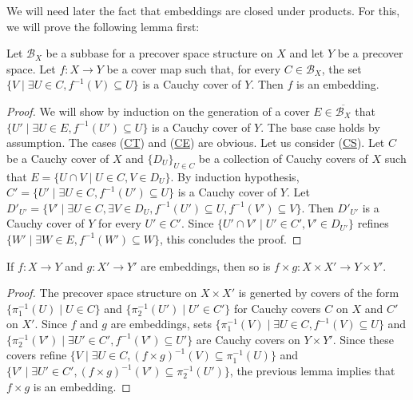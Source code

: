 \documentclass[reqno]{amsart}
\newcommand{\axref}[1]{(\hyperref[ax:#1]{#1})}
\theoremstyle{definition}
\theoremstyle{remark}
\numberwithin{figure}{section}
\begin{document}
We will need later the fact that embeddings are closed under products.
For this, we will prove the following lemma first:

\begin{lem}
Let $\mathcal{B}_X$ be a subbase for a precover space structure on $X$ and let $Y$ be a precover space.
Let $f : X \to Y$ be a cover map such that, for every $C \in \mathcal{B}_X$, the set $\{ V \mid \exists U \in C, f^{-1}(V) \subseteq U \}$ is a Cauchy cover of $Y$.
Then $f$ is an embedding.
\end{lem}
\begin{proof}
We will show by induction on the generation of a cover $E \in \overline{\mathcal{B}_X}$ that $\{ U' \mid \exists U \in E, f^{-1}(U') \subseteq U \}$ is a Cauchy cover of $Y$.
The base case holds by assumption.
The cases \axref{CT} and \axref{CE} are obvious.
Let us consider \axref{CS}.
Let $C$ be a Cauchy cover of $X$ and $\{ D_U \}_{U \in C}$ be a collection of Cauchy covers of $X$ such that $E = \{ U \cap V \mid U \in C, V \in D_U \}$.
By induction hypothesis, $C' = \{ U' \mid \exists U \in C, f^{-1}(U') \subseteq U \}$ is a Cauchy cover of $Y$.
Let $D'_{U'} = \{ V' \mid \exists U \in C, \exists V \in D_U, f^{-1}(U') \subseteq U, f^{-1}(V') \subseteq V \}$.
Then $D'_{U'}$ is a Cauchy cover of $Y$ for every $U' \in C'$.
Since $\{ U' \cap V' \mid U' \in C', V' \in D_{U'} \}$ refines $\{ W' \mid \exists W \in E, f^{-1}(W') \subseteq W \}$, this concludes the proof.
\end{proof}

\begin{lem}
If $f : X \to Y$ and $g : X' \to Y'$ are embeddings, then so is $f \times g : X \times X' \to Y \times Y'$.
\end{lem}
\begin{proof}
The precover space structure on $X \times X'$ is generted by covers of the form $\{ \pi_1^{-1}(U) \mid U \in C \}$ and $\{ \pi_2^{-1}(U') \mid U' \in C' \}$ for Cauchy covers $C$ on $X$ and $C'$ on $X'$.
Since $f$ and $g$ are embeddings, sets $\{ \pi_1^{-1}(V) \mid \exists U \in C, f^{-1}(V) \subseteq U \}$ and $\{ \pi_2^{-1}(V') \mid \exists U' \in C', f^{-1}(V') \subseteq U' \}$ are Cauchy covers on $Y \times Y'$.
Since these covers refine $\{ V \mid \exists U \in C, (f \times g)^{-1}(V) \subseteq \pi_1^{-1}(U) \}$ and $\{ V' \mid \exists U' \in C', (f \times g)^{-1}(V') \subseteq \pi_2^{-1}(U') \}$, the previous lemma implies that $f \times g$ is an embedding.
\end{proof}
\end{document}
